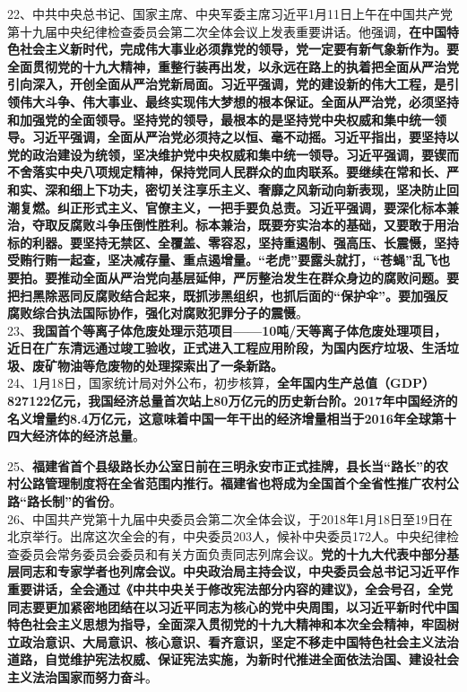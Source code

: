 22、中共中央总书记、国家主席、中央军委主席习近平1月11日上午在中国共产党第十九届中央纪律检查委员会第二次全体会议上发表重要讲话。他强调，{\textbf{在中国特色社会主义新时代，完成伟大事业必须靠党的领导，党一定要有新气象新作为。要全面贯彻党的十九大精神，重整行装再出发，以永远在路上的执着把全面从严治党引向深入，开创全面从严治党新局面。习近平强调，党的建设新的伟大工程，是引领伟大斗争、伟大事业、最终实现伟大梦想的根本保证。全面从严治党，必须坚持和加强党的全面领导。坚持党的领导，最根本的是坚持党中央权威和集中统一领导。习近平强调，全面从严治党必须持之以恒、毫不动摇。习近平指出，要坚持以党的政治建设为统领，坚决维护党中央权威和集中统一领导。习近平强调，要锲而不舍落实中央八项规定精神，保持党同人民群众的血肉联系。要继续在常和长、严和实、深和细上下功夫，密切关注享乐主义、奢靡之风新动向新表现，坚决防止回潮复燃。纠正形式主义、官僚主义，一把手要负总责。习近平强调，要深化标本兼治，夺取反腐败斗争压倒性胜利。标本兼治，既要夯实治本的基础，又要敢于用治标的利器。要坚持无禁区、全覆盖、零容忍，坚持重遏制、强高压、长震慑，坚持受贿行贿一起查，坚决减存量、重点遏增量。``老虎''要露头就打，``苍蝇''乱飞也要拍。要推动全面从严治党向基层延伸，严厉整治发生在群众身边的腐败问题。要把扫黑除恶同反腐败结合起来，既抓涉黑组织，也抓后面的``保护伞''。要加强反腐败综合执法国际协作，强化对腐败犯罪分子的震慑}}。\\
23、{\textbf{我国首个等离子体危废处理示范项目------10吨/天等离子体危废处理项目，近日在广东清远通过竣工验收，正式进入工程应用阶段，为国内医疗垃圾、生活垃圾、废矿物油等危废物的处理探索出了一条新路。}}\\
24、1月18日，国家统计局对外公布，初步核算，{\textbf{全年国内生产总值（GDP）827122亿元，我国经济总量首次站上80万亿元的历史新台阶。2017年中国经济的名义增量约8.4万亿元，这意味着中国一年干出的经济增量相当于2016年全球第十四大经济体的经济总量}}。

25、{\textbf{福建省首个县级路长办公室日前在三明永安市正式挂牌，县长当``路长''的农村公路管理制度将在全省范围内推行。福建省也将成为全国首个全省性推广农村公路``路长制''的省份}}。\\
26、中国共产党第十九届中央委员会第二次全体会议，于2018年1月18日至19日在北京举行。出席这次全会的有，中央委员203人，候补中央委员172人。中央纪律检查委员会常务委员会委员和有关方面负责同志列席会议。{\textbf{党的十九大代表中部分基层同志和专家学者也列席会议。中央政治局主持会议，中央委员会总书记习近平作重要讲话，全会通过《中共中央关于修改宪法部分内容的建议》，全会号召，全党同志要更加紧密地团结在以习近平同志为核心的党中央周围，以习近平新时代中国特色社会主义思想为指导，全面深入贯彻党的十九大精神和本次全会精神，牢固树立政治意识、大局意识、核心意识、看齐意识，坚定不移走中国特色社会主义法治道路，自觉维护宪法权威、保证宪法实施，为新时代推进全面依法治国、建设社会主义法治国家而努力奋斗}}。


